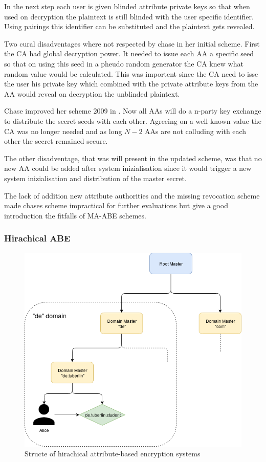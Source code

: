 In the next step each user is given blinded attribute private keys so that when used on decryption the plaintext is still blinded with the user specific identifier. Using pairings this identifier can be substituted and the plaintext gets revealed. 

Two cural disadventages where not respected by chase in her initial scheme. First the CA had global decryption power. It needed to issue each AA a specific seed so that on using this seed in a pheudo random generator the CA knew what random value would be calculated. This was importent since the CA need to isse the user his private key which combined with the private attribute keys from the AA would reveal on decryption the unblinded plaintext. 

Chase improved her scheme 2009 in \cite{chase2009improving}. Now all AAs will do a n-party key exchange to distribute the secret seeds with each other. Agreeing on a well known value the CA was no longer needed and as long $N-2$ AAs are not colluding with each other the secret remained secure. 

The other disadventage, that was will present in the updated scheme, was that no new AA could be added after system inizialisation since it would trigger a new system inizialisation and distribution of the master secret. 

The lack of addition new attribute authorities and the missing revocation scheme made chases scheme impractical for further evaluations but give a good introduction the fitfalls of MA-ABE schemes.

\subsubsection{Hirachical ABE}
\label{sec:HABE}

\begin{figure}[!ht]
\centering
    \includegraphics[width=0.5\linewidth]{img/HABE.png}
    \caption{Structe of hirachical attribute-based encryption systems}
    \label{fig:habe}
\end{figure}

